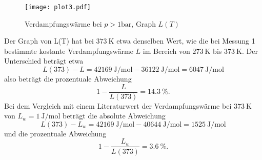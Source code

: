 \begin{figure}[h]
  \centering
  \texttt{[image: plot3.pdf]}
  \caption{Verdampfungswärme bei $p > 1\si{\bar}$, Graph $L(T)$}
  \label{fig:L}
\end{figure}

Der Graph von L(T) hat bei $\SI{373}{\kelvin}$ etwa denselben Wert, wie die
bei Messung 1 bestimmte kostante Verdampfungswärme $L$ im Bereich von
$\SI{273}{\kelvin}$ bis $\SI{373}{\kelvin}$.
Der Unterschied beträgt etwa
\begin{equation}
  L(373) - L = \SI{42169}{\joule\per\mol} - \SI{36122}{\joule\per\mol} =
  \SI{6047}{\joule\per\mol}
\end{equation}
also beträgt die prozentuale Abweichung
\begin{equation}
  1 - \frac{L}{L(373)} = \SI{14.3}{\percent} .
\end{equation}
Bei dem Vergleich mit einem Literaturwert der
Verdampfungswärme\cite{verdampfungswärme}
bei
$\SI{373}{\kelvin}$ von $L_w = \SI{1}{\joule\per\mol}$ beträgt die absolute
Abweichung
\begin{equation}
  L(373) - L_w = \SI{42169}{\joule\per\mol} - \SI{40644}{\joule\per\mol} =
  \SI{1525}{\joule\per\mol}
\end{equation}
und die prozentuale Abweichung
\begin{equation}
  1 - \frac{L_w}{L(373)} = \SI{3.6}{\percent} .
\end{equation}

\newpage
